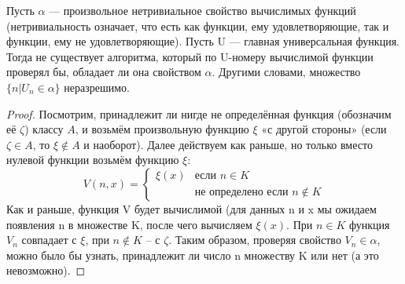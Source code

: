 \begin{theorem}
Пусть $\alpha $ — произвольное нетривиальное свойство вычислимых функций (нетривиальность означает, что есть как
	функции, ему удовлетворяющие, так и функции, ему не удовлетворяющие). Пусть U — главная универсальная функция.
	Тогда не существует алгоритма, который по U-номеру вычислимой функции проверял бы, обладает ли она свойством
	$\alpha$. Другими словами, множество $\{n | U_n \in \alpha \}$ неразрешимо.
\end{theorem}
\begin{proof}
Посмотрим, принадлежит ли нигде не определённая функция (обозначим её $\zeta$) классу $A$, и возьмём произвольную
	функцию $\xi$ «с другой стороны» (если $\zeta \in A$, то $\xi \notin A$ и наоборот). Далее действуем как
	раньше, но только вместо нулевой функции возьмём функцию $\xi$: 
\begin{equation*}
V(n,x) = 
 \begin{cases}
   \xi (x) &\text{если $n \in K$}\\
   &\text{не определено если $n \notin K$}
 \end{cases}
\end{equation*} 
Как и раньше, функция V будет вычислимой (для данных n и x мы ожидаем появления n в множестве K, после чего вычисляем $\xi (x)$. При $n \in K$ функция $V_n$ совпадает с $\xi$, при $n \notin K$ -- с $\zeta$. Таким образом, проверяя свойство $V_n \in \alpha$, можно было бы узнать, принадлежит ли число n множеству K или нет (а это невозможно).
\end{proof}
